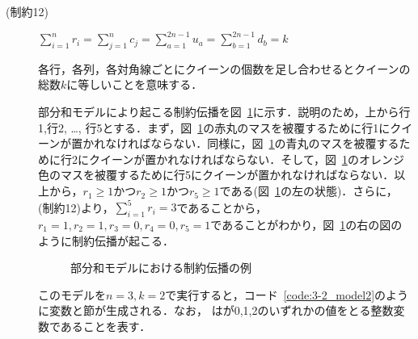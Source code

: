 \begin{description}
 \item[(制約12)] $\sum\limits_{i=1}^{n} r_{i} = \sum\limits_{j=1}^{n} c_{j} =\sum\limits_{a=1}^{2n-1} u_{a} =\sum\limits_{b=1}^{2n-1} d_{b} = k$ \par
各行，各列，各対角線ごとにクイーンの個数を足し合わせるとクイーンの総数$k$に等しいことを意味する．\par

部分和モデルにより起こる制約伝播を図~\ref{fig:constraint}に示す．説明のため，上から行1,行2, \dots , 行5とする．まず，図~\ref{fig:constraint}の赤丸のマスを被覆するために行1にクイーンが置かれなければならない．同様に，図~\ref{fig:constraint}の青丸のマスを被覆するために行2にクイーンが置かれなければならない．そして，図~\ref{fig:constraint}のオレンジ色のマスを被覆するために行5にクイーンが置かれなければならない．以上から，$r_1 \geq 1$かつ$r_2 \geq 1$かつ$r_5 \geq 1$である(図~\ref{fig:constraint}の左の状態)．さらに，(制約12)より，$\sum\limits _{i=1}^{5} r_i = 3$であることから，$r_1 = 1,r_2=1,r_3=0,r_4=0,r_5=1$であることがわかり，図~\ref{fig:constraint}の右の図のように制約伝播が起こる．

\begin{figure}[htb]
 \begin{minipage}[b]{0.45\linewidth}
  \centering
  
 \end{minipage}
 \begin{minipage}[b]{0.45\linewidth}
  
 \end{minipage}
 \caption{部分和モデルにおける制約伝播の例}
 \label{fig:constraint}
\end{figure}

このモデルを$n=3,k=2$で実行すると，コード~\ref{code:3-2_model2}のように変数と節が生成される．なお，  はが0,1,2のいずれかの値をとる整数変数であることを表す．


\end{description}